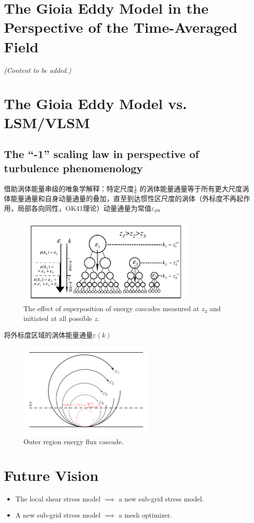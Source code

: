 \documentclass[10pt]{article}
\begin{document}
\section{The Gioia Eddy Model in the Perspective of the Time-Averaged Field}
\textit{(Content to be added.)}

\section{The Gioia Eddy Model vs. LSM/VLSM}
\subsection{The ``-1'' scaling law in perspective of turbulence phenomenology}
\citet{nikora1999prl} 借助涡体能量串级的唯象学解释：特定尺度$\frac{1}{k}$ 的涡体能量通量等于所有更大尺度涡体能量通量和自身动量通量的叠加，直至到达惯性区尺度的涡体（外标度不再起作用，局部各向同性，OK41理论）动量通量为常值$\varepsilon_d$。

\begin{figure}[htpb]
    \centering
    \includegraphics[width=0.8\textwidth]{./figures/energy-cascade.png}
    \caption{The effect of superposition of energy cascades measured at $z_3$ and initiated at all possible $z$. \cite{nikora1999prl}}
    \label{fig:-figures-energy-cascade-png}
\end{figure}

将外标度区域的涡体能量通量$\varepsilon(k)$

\begin{figure}[htpb]
    \centering
    \includegraphics[width=0.6\textwidth]{./figures/cascade.pdf}
    \caption{Outer region energy flux cascade.}
    \label{fig:-figures-cascade-pdf}
\end{figure}
\section{Future Vision}
\begin{itemize}
    \item The local shear stress model $\implies$ a new sub-grid stress model.
    \item A new sub-grid stress model $\implies$ a mesh optimizer.
\end{itemize}

\printbibliography[heading=bibintoc, title={References}]
\end{document}
